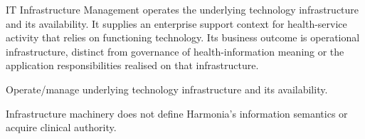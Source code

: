 IT Infrastructure Management operates the underlying technology infrastructure and its availability. It supplies an enterprise support context for health-service activity that relies on functioning technology. Its business outcome is operational infrastructure, distinct from governance of health-information meaning or the application responsibilities realised on that infrastructure.



Operate/\allowbreak{}manage underlying technology infrastructure and its availability.



Infrastructure machinery does not define Harmonia's information semantics or acquire clinical authority.


